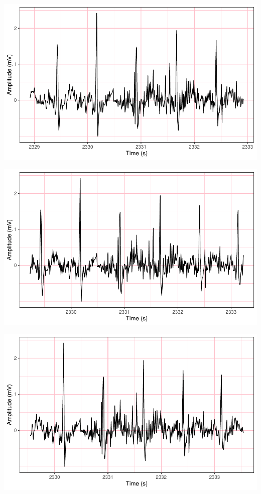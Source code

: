\documentclass[
]{article}
\begin{document}
\begin{center}\includegraphics{report_files/figure-latex/abnormal-interval-3} \end{center}

\begin{center}\includegraphics{report_files/figure-latex/abnormal-interval-4} \end{center}

\begin{center}\includegraphics{report_files/figure-latex/abnormal-interval-5} \end{center}
\end{document}
